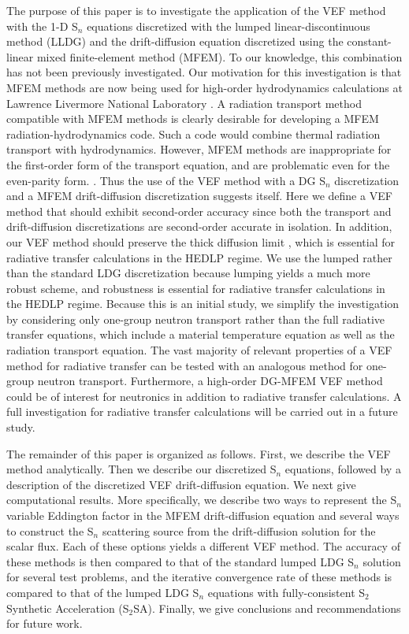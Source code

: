 The purpose of this paper is to investigate the application of the VEF method with the 1-D S$_n$ equations 
discretized with the lumped linear-discontinuous method (LLDG) and the drift-diffusion equation discretized using the 
constant-linear mixed finite-element method (MFEM).  To our knowledge, this combination has not been previously 
investigated.  Our motivation for this investigation is that MFEM methods are now being used for high-order hydrodynamics 
calculations at Lawrence Livermore National Laboratory \cite{*}.  A radiation transport method compatible with MFEM 
methods is clearly desirable for developing a MFEM radiation-hydrodynamics code.  Such a code would combine thermal 
radiation transport with hydrodynamics.  However, MFEM methods are inappropriate for the first-order form of the 
transport equation, and are problematic even for the even-parity form. \cite{*}.  
Thus the use of the VEF method with a DG S$_n$ discretization and a MFEM drift-diffusion discretization suggests itself.
Here we define a VEF method that should exhibit second-order accuracy since both the transport and drift-diffusion 
discretizations are second-order accurate in isolation.  In addition, our VEF method should preserve the thick diffusion 
limit \cite{*}, which is essential for radiative transfer calculations in the HEDLP regime. We use the lumped 
rather than the standard LDG discretization because lumping yields a much more robust scheme, and robustness is essential 
for radiative transfer calculations in the HEDLP regime.   Because this is an initial study, we simplify the investigation by considering 
only one-group neutron transport rather than the full radiative transfer equations, which include a 
material temperature equation as well as the radiation transport equation.  The vast majority of relevant properties of  
a VEF method for radiative transfer can be tested with an analogous method for one-group neutron transport.  Furthermore, 
a high-order DG-MFEM VEF method could be of interest for neutronics in addition to radiative transfer calculations. 
A full investigation for radiative transfer calculations will be carried out in a future study. 

The remainder of this paper is organized as follows.  First, we describe the VEF method analytically. Then we describe 
our discretized S$_n$ equations, followed by a description of the discretized VEF drift-diffusion equation.  We next give 
computational results.  More specifically, we describe 
two ways to represent the S$_n$ variable Eddington factor in the MFEM drift-diffusion equation and several ways to 
construct the S$_n$ scattering source from the drift-diffusion solution for the scalar flux. Each of these options 
yields a different VEF method.  The accuracy of these methods is then compared to that of the standard lumped LDG 
S$_n$ solution for several test problems, and the iterative convergence rate of these methods is compared to that of the 
lumped LDG S$_n$ equations with fully-consistent S$_2$ Synthetic Acceleration (S$_2$SA). Finally, we give conclusions and 
recommendations for future work.